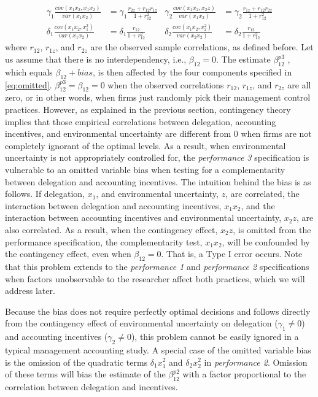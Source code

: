 \documentclass[12pt]{article}
\begin{document}
\begin{equation}\label{eq:omitted}
\begin{aligned}
\gamma_1 \frac{cov(x_1 x_2, x_1 x_2)}{var(x_1 x_2)} &= 
\gamma_1 \frac{r_{2z} + r_{12} r_{1z}}{1 + r_{12}^2}
&\gamma_2 \frac{cov(x_1 x_2, x_2 z)}{var(x_1 x_2)} &= 
\gamma_2 \frac{r_{1z} + r_{12} r_{2z}}{1 + r_{12}^2}
\\
\delta_1 \frac{cov(x_1 x_2, x_1^2)}{var(x_1 x_2)} &= 
\delta_1 \frac{r_{12}}{1 + r_{12}^2}
&\delta_2 \frac{cov(x_1 x_2, x_2^2)}{var(x_2 x_2)} &= 
\delta_2 \frac{r_{12}}{1 + r_{12}^2}
\end{aligned}
\end{equation}
where $r_{12}$, $r_{1z}$, and $r_{2z}$ are the observed sample correlations, as defined before. Let us assume that there is no interdependency, i.e., $\beta_{12}=0$. The estimate $\beta^{p3}_{12}$ , which equals $\beta_{12} + bias$, is then affected by the four components specified in \eqref{eq:omitted}. $\beta^{p3}_{12}=\beta_{12}=0$ when the observed correlations $r_{12}$, $r_{1z}$, and $r_{2z}$ are all zero, or in other words, when firms just randomly pick their management control practices. However, as explained in the previous section, contingency theory implies that those empirical correlations between delegation, accounting incentives, and environmental uncertainty are different from $0$ when firms are not completely ignorant of the optimal levels. As a result, when environmental uncertainty is not appropriately controlled for, the \emph{performance 3} specification is vulnerable to an omitted variable bias when testing for a complementarity between delegation and accounting incentives. The intuition behind the bias is as follows. If delegation, $x_1$, and environmental uncertainty, $z$, are correlated, the interaction between delegation and accounting incentives, $x_1 x_2$, and the interaction between accounting incentives and environmental uncertainty, $x_2 z$, are also correlated. As a result, when the contingency effect, $x_2 z$, is omitted from the performance specification, the complementarity test, $x_1 x_2$, will be confounded by the contingency effect, even when $\beta_{12}=0$. That is, a Type I error occurs. Note that this problem extends to the \emph{performance 1} and \emph{performance 2} specifications when factors unobservable to the researcher affect both practices, which we will address later.

Because the bias does not require perfectly optimal decisions and follows directly from the contingency effect of environmental uncertainty on delegation ($\gamma_1 \neq 0$) and accounting incentives ($\gamma_2 \neq 0$), this problem cannot be easily ignored in a typical management accounting study. A special case of the omitted variable bias is the omission of the quadratic terms $\delta_1 x_1^2$ and $\delta_2 x_2^2$ in \emph{performance 2}. Omission of these terms will bias the estimate of the $\beta^{p2}_{12}$ with a factor proportional to the correlation between delegation and incentives.
\end{document}
